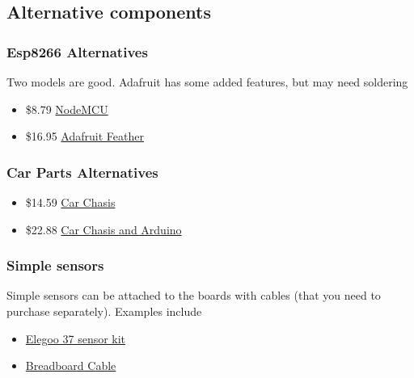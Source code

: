 \subsection{Alternative components}\label{alternative-components}

\subsubsection{Esp8266 Alternatives}\label{esp8266-alternatives}

Two models are good. Adafruit has some added features, but may need
soldering

\begin{itemize}
\tightlist
\item
  \$8.79
  \href{https://www.amazon.com/HiLetgo-Version-NodeMCU-Internet-Development/dp/B010O1G1ES/ref=sr_1_3?s=electronics\&ie=UTF8\&qid=1499251149\&sr=1-3\&keywords=esp8266}{NodeMCU}
\item
  \$16.95 \href{https://www.adafruit.com/product/2821}{Adafruit Feather}
\end{itemize}

\subsubsection{Car Parts Alternatives}\label{car-parts-alternatives}

\begin{itemize}
\tightlist
\item
  \$14.59
  \href{https://www.amazon.com/Ardokit-Chassis-Encoder-Battery-Arduino/dp/B00K5OWHXO/ref=sr_1_3?s=electronics\&ie=UTF8\&qid=1499251712\&sr=1-3\&keywords=robot+car}{Car
  Chasis}
\item
  \$22.88
  \href{https://www.amazon.com/VKmaker-Avoidance-tracking-Chassis-Ultrasonic/dp/B01CXVA6IO/ref=sr_1_6?s=electronics\&ie=UTF8\&qid=1499251770\&sr=1-6\&keywords=robot+car}{Car
  Chasis and Arduino}
\end{itemize}

\subsubsection{Simple sensors}\label{simple-sensors}

Simple sensors can be attached to the boards with cables (that you need
to purchase separately). Examples include

\begin{itemize}
\tightlist
\item
  \href{https://www.amazon.com/Elegoo-Sensor-Module-Arduino-MEGA/dp/B009OVGKTQ/ref=sr_1_5?s=electronics\&ie=UTF8\&qid=1500678010\&sr=1-5\&keywords=grove+sensor}{Elegoo
  37 sensor kit}
\item
  \href{https://www.amazon.com/Breadboard-Wires-Aoyoho-Multicolored-Jumper/dp/B01GK2Q4ZQ/ref=sr_1_1?s=electronics\&ie=UTF8\&qid=1500678142\&sr=1-1\&keywords=bread+board+cab\%3Be}{Breadboard
  Cable}
\end{itemize}

